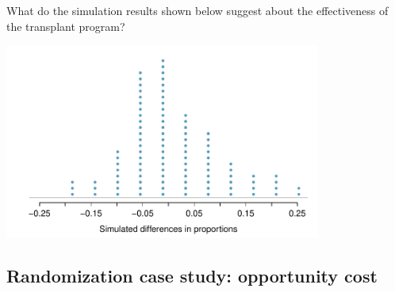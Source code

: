 {\begin{parts}
\begin{subparts}
\begin{adjustwidth}{2em}{2em}
\end{adjustwidth}
\item What do the simulation results shown below suggest about the effectiveness of the transplant program?
\end{subparts}
\end{parts}
\begin{center}
\includegraphics[width = 0.78\textwidth]{01/figures/eoce/heartTr/heartTr_RandHist} \\
\end{center}
}{}

\textA{\pagebreak}


\subsection{Randomization case study: opportunity cost} %

